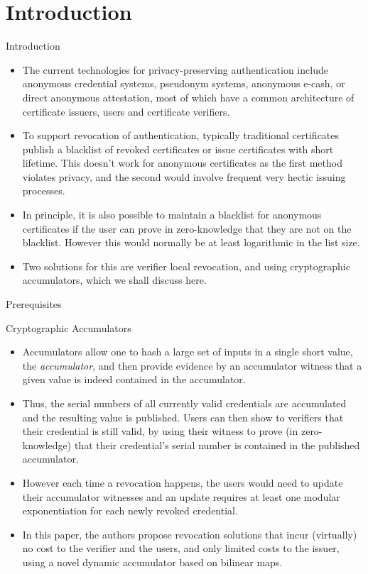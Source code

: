 \documentclass{beamer}
\begin{document}
\section{Introduction}
\begin{frame}{Introduction}
    \begin{itemize}
        \justifying
        \item The current technologies for privacy-preserving authentication include anonymous credential systems, pseudonym systems, anonymous e-cash, or direct anonymous attestation, most of which have a common architecture of certificate issuers, users and certificate verifiers.
        \item To support revocation of authentication, typically traditional certificates publish a blacklist of revoked certificates or issue certificates with short lifetime. This doesn't work for anonymous certificates as the first method violates privacy, and the second would involve frequent very hectic issuing processes.
        \item In principle, it is also possible to maintain a blacklist for anonymous certificates if the user can prove in zero-knowledge that they are not on the blacklist. However this would normally be at least logarithmic in the list size.
        \item Two solutions for this are verifier local revocation, and using cryptographic accumulators, which we shall discuss here.
    \end{itemize}
\end{frame}

\begin{frame}{Prerequisites}\vspace{-2mm}
\begin{block}{Cryptographic Accumulators}
    \begin{itemize}\justifying
        \item Accumulators allow one to hash a large set of inputs in a single short value, the \textit{accumulator}, and then provide evidence by an accumulator witness that a given value is indeed contained in the accumulator.
        \item Thus, the serial numbers of all currently valid credentials are accumulated and the resulting value is published. Users can then show to verifiers that their credential is still valid, by using their witness to prove (in zero-knowledge) that their credential’s serial number is contained in the published accumulator.
        \item However each time a revocation happens, the users would need to update their accumulator witnesses and an update requires at least one modular exponentiation for each newly revoked credential.
        \item In this paper, the authors propose revocation solutions that incur (virtually) no cost to the verifier and the users, and only limited costs to the issuer, using a novel dynamic accumulator based on bilinear maps.
    \end{itemize}
\end{block}
\end{frame}
\end{document}
